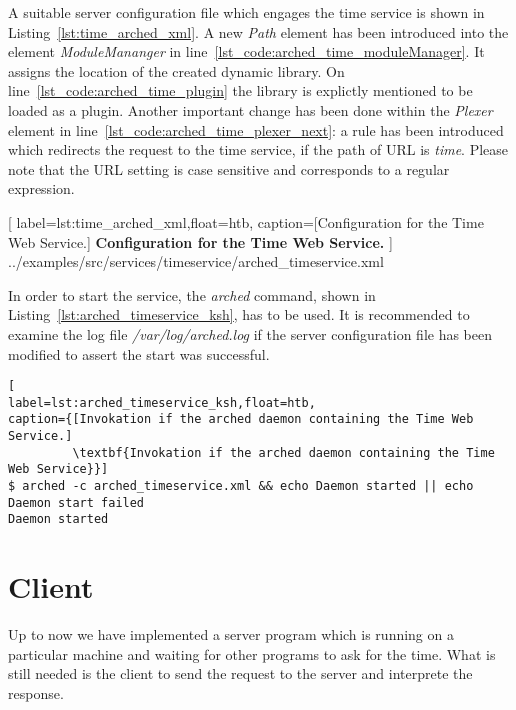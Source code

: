 A suitable server configuration file which engages the time service is shown in Listing~\ref{lst:time_arched_xml}.
A new \textit{Path} element has been introduced into the element \textit{ModuleMananger} in line~\ref{lst_code:arched_time_moduleManager}.
It assigns the location of the created dynamic library.
On line~\ref{lst_code:arched_time_plugin} the library is explictly mentioned to be loaded as a plugin.
Another important change has been done within the \textit{Plexer} element in line~\ref{lst_code:arched_time_plexer_next}:
a rule has been introduced which redirects the request to the time service, if the path of URL is \textit{time}. 
Please note that the URL setting is case sensitive and corresponds to a regular expression.\\


	[
	label=lst:time_arched_xml,float=htb,
	caption={[Configuration for the Time Web Service.]
	\textbf{Configuration for the Time Web Service.}}
	]
{../examples/src/services/timeservice/arched_timeservice.xml}

In order to start the service, the \textit{arched} command, shown in Listing~\ref{lst:arched_timeservice_ksh}, has to be used.
It is recommended to examine the log file \textit{/var/log/arched.log} if the server configuration file has been modified to  assert the start was successful.

\begin{lstlisting}[
label=lst:arched_timeservice_ksh,float=htb,
caption={[Invokation if the arched daemon containing the Time Web Service.]
         \textbf{Invokation if the arched daemon containing the Time Web Service}}]
$ arched -c arched_timeservice.xml && echo Daemon started || echo Daemon start failed
Daemon started
\end{lstlisting}



\section{Client}\label{sec:timeservice_client}

Up to now we have implemented a server program which is running on a particular machine and waiting for other programs to ask for the time. What is still needed is the client to send the request to the server and interprete the response.

